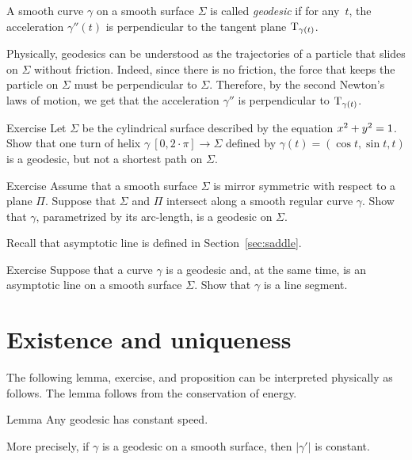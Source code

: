 A smooth curve $\gamma$ on a smooth surface $\Sigma$ is called \emph{geodesic} if for any~$t$, the acceleration $\gamma''(t)$ is perpendicular to the tangent plane $\mathrm{T}_{\gamma(t)}$.

Physically, geodesics can be understood as the trajectories of a particle that slides on $\Sigma$ without friction.
Indeed, since there is no friction, the force that keeps the particle on $\Sigma$ must be perpendicular to $\Sigma$.
Therefore, by the second Newton's laws of motion,
we get that the acceleration $\gamma''$ is perpendicular to $\mathrm{T}_{\gamma(t)}$.

\begin{thm}{Exercise}\label{ex:helix=geodesic}
Let $\Sigma$ be the cylindrical surface described by the equation $x^2\z+y^2=1$.
Show that one turn of helix $\gamma\:[0,2\cdot\pi]\to \Sigma$ defined by $\gamma(t)=(\cos t,\sin t, t)$
is a geodesic, but not a shortest path on $\Sigma$.
\end{thm}

\begin{thm}{Exercise}\label{ex:reflection-geodesic}
Assume that a smooth surface $\Sigma$ is mirror symmetric with respect to  a plane $\Pi$.
Suppose that $\Sigma$ and $\Pi$ intersect along a smooth regular curve $\gamma$.
Show that $\gamma$, parametrized by its arc-length, is a geodesic on $\Sigma$.
\end{thm}

Recall that asymptotic line is defined in Section~\ref{sec:saddle}.

\begin{thm}{Exercise}\label{ex:asymptotic-geodesic}
Suppose that a curve $\gamma$ is a geodesic and, at the same time, is an asymptotic line on a smooth surface $\Sigma$.
Show that $\gamma$ is a line segment.
\end{thm}

\section{Existence and uniqueness}

The following lemma, exercise, and proposition can be interpreted physically as follows.
The lemma follows from the conservation of energy.

\begin{thm}{Lemma}\label{lem:constant-speed}
Any geodesic has constant speed.

More precisely, if $\gamma$ is a geodesic on a smooth surface, then $|\gamma'|$ is constant.
\end{thm}

